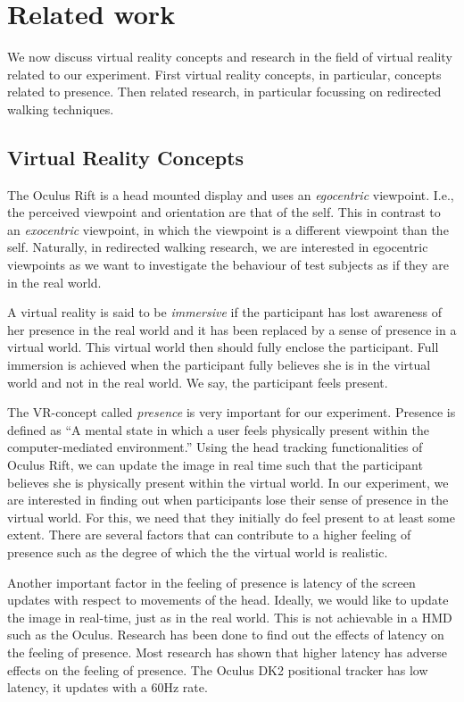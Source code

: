 \section{Related work}
We now discuss virtual reality concepts and research in the field of virtual reality related to our experiment.
First virtual reality concepts, in particular, concepts related to presence. 
Then related research, in particular focussing on redirected walking techniques.

\subsection{Virtual Reality Concepts}\label{sec:concepts}
The Oculus Rift is a head mounted display and uses an \textit{egocentric} viewpoint. 
I.e., the perceived viewpoint and orientation are that of the self.
This in contrast to an \textit{exocentric} viewpoint, in which the viewpoint is a different viewpoint than the self. 
Naturally, in redirected walking research, we are interested in egocentric viewpoints as we want to investigate the behaviour of test subjects as if they are in the real world.

A virtual reality is said to be \textit{immersive} if the participant has lost awareness of her presence in the real world and it has been replaced by a sense of presence in a virtual world. 
This virtual world then should fully enclose the participant.
Full immersion is achieved when the participant fully believes she is in the virtual world and not in the real world.
We say, the participant feels present.

The VR-concept called \textit{presence} is very important for our experiment.
Presence is defined as ``A mental state in which a user feels physically present within the computer-mediated environment.''
Using the head tracking functionalities of Oculus Rift, we can update the image in real time such that the participant believes she is physically present within the virtual world.
In our experiment, we are interested in finding out when participants lose their sense of presence in the virtual world. 
For this, we need that they initially do feel present to at least some extent.
There are several factors that can contribute to a higher feeling of presence such as the degree of which the the virtual world is realistic.

Another important factor in the feeling of presence is latency of the screen updates with respect to movements of the head.
Ideally, we would like to update the image in real-time, just as in the real world. 
This is not achievable in a HMD such as the Oculus. 
Research has been done to find out the effects of latency on the feeling of presence.\cite{meehan}
Most research has shown that higher latency has adverse effects on the feeling of presence.
The Oculus DK2 positional tracker has low latency, it updates with a 60Hz rate.

